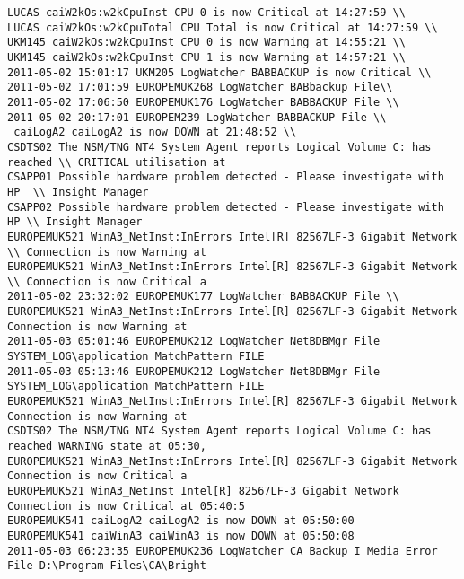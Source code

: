 \begin{lstlisting}
LUCAS caiW2kOs:w2kCpuInst CPU 0 is now Critical at 14:27:59 \\
LUCAS caiW2kOs:w2kCpuTotal CPU Total is now Critical at 14:27:59 \\
UKM145 caiW2kOs:w2kCpuInst CPU 0 is now Warning at 14:55:21 \\
UKM145 caiW2kOs:w2kCpuInst CPU 1 is now Warning at 14:57:21 \\
2011-05-02 15:01:17 UKM205 LogWatcher BABBACKUP is now Critical \\
2011-05-02 17:01:59 EUROPEMUK268 LogWatcher BABbackup File\\ 
2011-05-02 17:06:50 EUROPEMUK176 LogWatcher BABBACKUP File \\ 
2011-05-02 20:17:01 EUROPEM239 LogWatcher BABBACKUP File \\ 
 caiLogA2 caiLogA2 is now DOWN at 21:48:52 \\
CSDTS02 The NSM/TNG NT4 System Agent reports Logical Volume C: has reached \\ CRITICAL utilisation at
CSAPP01 Possible hardware problem detected - Please investigate with HP  \\ Insight Manager
CSAPP02 Possible hardware problem detected - Please investigate with HP \\ Insight Manager
EUROPEMUK521 WinA3_NetInst:InErrors Intel[R] 82567LF-3 Gigabit Network \\ Connection is now Warning at
EUROPEMUK521 WinA3_NetInst:InErrors Intel[R] 82567LF-3 Gigabit Network \\ Connection is now Critical a
2011-05-02 23:32:02 EUROPEMUK177 LogWatcher BABBACKUP File \\
EUROPEMUK521 WinA3_NetInst:InErrors Intel[R] 82567LF-3 Gigabit Network Connection is now Warning at
2011-05-03 05:01:46 EUROPEMUK212 LogWatcher NetBDBMgr File SYSTEM_LOG\application MatchPattern FILE
2011-05-03 05:13:46 EUROPEMUK212 LogWatcher NetBDBMgr File SYSTEM_LOG\application MatchPattern FILE
EUROPEMUK521 WinA3_NetInst:InErrors Intel[R] 82567LF-3 Gigabit Network Connection is now Warning at
CSDTS02 The NSM/TNG NT4 System Agent reports Logical Volume C: has reached WARNING state at 05:30,
EUROPEMUK521 WinA3_NetInst:InErrors Intel[R] 82567LF-3 Gigabit Network Connection is now Critical a
EUROPEMUK521 WinA3_NetInst Intel[R] 82567LF-3 Gigabit Network Connection is now Critical at 05:40:5
EUROPEMUK541 caiLogA2 caiLogA2 is now DOWN at 05:50:00
EUROPEMUK541 caiWinA3 caiWinA3 is now DOWN at 05:50:08
2011-05-03 06:23:35 EUROPEMUK236 LogWatcher CA_Backup_I Media_Error File D:\Program Files\CA\Bright

\end{lstlisting}
